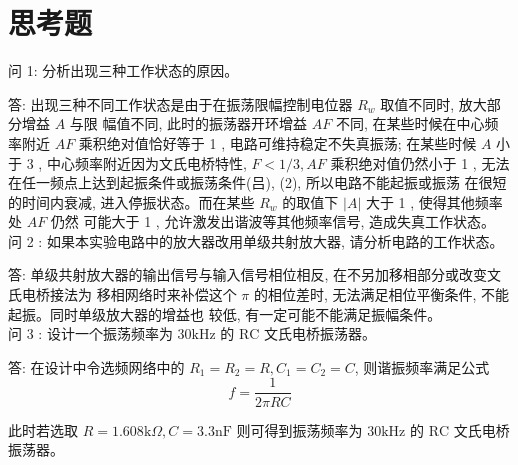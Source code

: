 \documentclass[a4paper,11pt,UTF8]{ctexart}
\begin{document}
\section{思考题}
问 1: 分析出现三种工作状态的原因。


答: 出现三种不同工作状态是由于在振荡限幅控制电位器 $R_{w}$ 取值不同时, 放大部分增益 $A$ 与限 幅值不同, 此时的振荡器开环增益 $A F$ 不同, 在某些时候在中心频率附近 $A F$ 乘积绝对值恰好等于 1 , 电路可维持稳定不失真振荡; 在某些时候 $A$ 小于 3 , 中心频率附近因为文氏电桥特性, $F<1 / 3, A F$ 乘积绝对值仍然小于 1 , 无法在任一频点上达到起振条件或振荡条件(吕), (2), 所以电路不能起振或振荡 在很短的时间内衰减, 进入停振状态。而在某些 $R_{w}$ 的取值下 $|A|$ 大于 1 , 使得其他频率处 $A F$ 仍然 可能大于 1 , 允许激发出谐波等其他频率信号, 造成失真工作状态。
\\

问 2 : 如果本实验电路中的放大器改用单级共射放大器, 请分析电路的工作状态。


答: 单级共射放大器的输出信号与输入信号相位相反, 在不另加移相部分或改变文氏电桥接法为 移相网络时来补偿这个 $\pi$ 的相位差时, 无法满足相位平衡条件, 不能起振。同时单级放大器的增益也 较低, 有一定可能不能满足振幅条件。
\\


问 3 : 设计一个振荡频率为 $30 \mathrm{kHz}$ 的 $\mathrm{RC}$ 文氏电桥振荡器。


答: 在设计中令选频网络中的 $R_{1}=R_{2}=R, C_{1}=C_{2}=C$, 则谐振频率满足公式
$$f=\frac{1}{2 \pi R C}$$


此时若选取 $R=1.608 \mathrm{k} \Omega, C=3.3 \mathrm{nF}$ 则可得到振荡频率为 $30 \mathrm{kHz}$ 的 $\mathrm{RC}$ 文氏电桥振荡器。
\\
\end{document}
